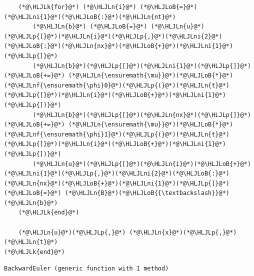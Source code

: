\documentclass[12pt,a4paper]{article}
\newcommand{\HLJLk}[1]{\textcolor[RGB]{148,91,176}{\textbf{#1}}}
\newcommand{\HLJLn}[1]{#1}
\newcommand{\HLJLnf}[1]{\textcolor[RGB]{66,102,213}{#1}}
\newcommand{\HLJLni}[1]{\textcolor[RGB]{59,151,46}{#1}}
\newcommand{\HLJLoB}[1]{\textcolor[RGB]{102,102,102}{\textbf{#1}}}
\newcommand{\HLJLp}[1]{#1}
\begin{document}
\begin{lstlisting}
    (*@\HLJLk{for}@*) (*@\HLJLn{i}@*) (*@\HLJLoB{=}@*) (*@\HLJLni{1}@*)(*@\HLJLoB{:}@*)(*@\HLJLn{nt}@*)
        (*@\HLJLn{b}@*) (*@\HLJLoB{=}@*) (*@\HLJLn{u}@*)(*@\HLJLp{[}@*)(*@\HLJLn{i}@*)(*@\HLJLp{,}@*)(*@\HLJLni{2}@*)(*@\HLJLoB{:}@*)(*@\HLJLn{nx}@*)(*@\HLJLoB{+}@*)(*@\HLJLni{1}@*)(*@\HLJLp{]}@*) 
        (*@\HLJLn{b}@*)(*@\HLJLp{[}@*)(*@\HLJLni{1}@*)(*@\HLJLp{]}@*) (*@\HLJLoB{+=}@*) (*@\HLJLn{\ensuremath{\mu}}@*)(*@\HLJLoB{*}@*)(*@\HLJLnf{\ensuremath{\phi}0}@*)(*@\HLJLp{(}@*)(*@\HLJLn{t}@*)(*@\HLJLp{[}@*)(*@\HLJLn{i}@*)(*@\HLJLoB{+}@*)(*@\HLJLni{1}@*)(*@\HLJLp{])}@*)
        (*@\HLJLn{b}@*)(*@\HLJLp{[}@*)(*@\HLJLn{nx}@*)(*@\HLJLp{]}@*) (*@\HLJLoB{+=}@*) (*@\HLJLn{\ensuremath{\mu}}@*)(*@\HLJLoB{*}@*)(*@\HLJLnf{\ensuremath{\phi}1}@*)(*@\HLJLp{(}@*)(*@\HLJLn{t}@*)(*@\HLJLp{[}@*)(*@\HLJLn{i}@*)(*@\HLJLoB{+}@*)(*@\HLJLni{1}@*)(*@\HLJLp{])}@*)
        (*@\HLJLn{u}@*)(*@\HLJLp{[}@*)(*@\HLJLn{i}@*)(*@\HLJLoB{+}@*)(*@\HLJLni{1}@*)(*@\HLJLp{,}@*)(*@\HLJLni{2}@*)(*@\HLJLoB{:}@*)(*@\HLJLn{nx}@*)(*@\HLJLoB{+}@*)(*@\HLJLni{1}@*)(*@\HLJLp{]}@*) (*@\HLJLoB{=}@*) (*@\HLJLn{B}@*)(*@\HLJLoB{{\textbackslash}}@*)(*@\HLJLn{b}@*)  
    (*@\HLJLk{end}@*)
    
    (*@\HLJLn{u}@*)(*@\HLJLp{,}@*) (*@\HLJLn{x}@*)(*@\HLJLp{,}@*) (*@\HLJLn{t}@*)
(*@\HLJLk{end}@*)
\end{lstlisting}

\begin{lstlisting}
BackwardEuler (generic function with 1 method)
\end{lstlisting}
\end{document}
